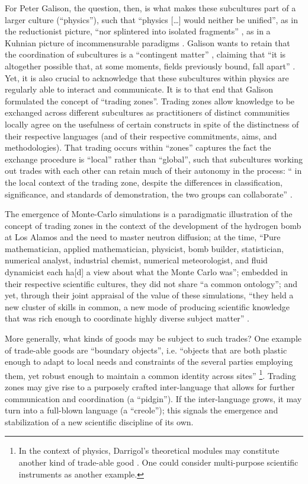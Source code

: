 \documentclass[smallextended]{svjour3}
\begin{document}
For Peter Galison, the question, then, is what makes these subcultures part of a larger culture (``physics''), such that ``physics [\dots] would neither be unified'', as in the reductionist picture, ``nor splintered into isolated fragments'' , as in a Kuhnian picture of incommensurable paradigms \citep[p.~782]{galison1987how}. Galison wants to retain that the coordination of subcultures is a ``contingent matter'' \citep[p.~18]{galison1997image}, claiming that ``it is altogether possible that, at some moments, fields previously bound, fall apart'' \citep[p.~805]{galison1997image}. Yet, it is also crucial to acknowledge that these subcultures within physics are regularly able to interact and communicate. It is to that end that Galison formulated the concept of ``trading zones''. Trading zones allow knowledge to be exchanged across different subcultures as practitioners of distinct communities locally agree on the usefulness of certain constructs in spite of the distinctness of their respective languages (and of their respective commitments, aims, and methodologies). That trading occurs within ``zones'' captures the fact the exchange procedure is  ``local'' rather than ``global'', such that subcultures working out trades with each other can retain much of their autonomy in the process: `` in the local context of the trading zone, despite the differences in classification, significance, and standards of demonstration, the two groups can collaborate'' \citep[p.~803]{galison1997image}.

The emergence of Monte-Carlo simulations is a paradigmatic illustration of the concept of trading zones in the context of the development of the hydrogen bomb at Los Alamos and the need to master neutron diffusion; at the time, ``Pure mathematician, applied mathematician, physicist, bomb builder, statistician, numerical analyst, industrial chemist, numerical meteorologist, and fluid dynamicist each ha[d] a view about what the Monte Carlo was''; embedded in their respective scientific cultures, they did not share ``a common ontology''; and yet, through their joint appraisal of the value of these simulations, ``they held a new cluster of skills in common, a new mode of producing scientific knowledge that was rich enough to coordinate highly diverse
subject matter'' \citep{Galison1996}.

More generally, what kinds of goods may be subject to such trades? One example of trade-able goods are ``boundary objects'', i.e. ``objects that are both plastic enough to adapt to local needs and constraints of the several parties employing them, yet robust enough to maintain a common identity across sites'' \citep[p.~393]{Star1989}\footnote{In the context of physics, Darrigol's theoretical modules may constitute another kind of trade-able good \citep[p.~214]{Darrigol2007}. One could consider multi-purpose scientific instruments \citep[pp.~179--182]{Shinn2005} as another example.}. Trading zones may give rise to a purposely crafted inter-language that allows for further communication and coordination (a ``pidgin''). If the inter-language grows, it may turn into a full-blown language (a ``creole''); this signals the emergence and stabilization of a new scientific discipline of its own. 
\end{document}

